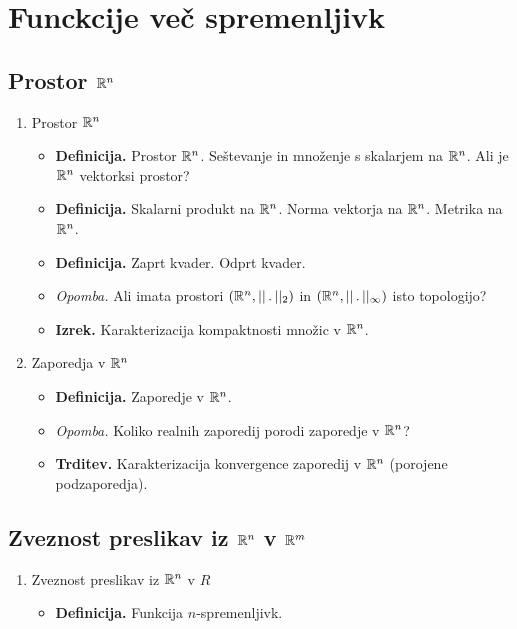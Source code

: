 \section{Funckcije več spremenljivk}
\subsection{Prostor $\mathbb{R}^n$}
\begin{enumerate}
    \item Prostor $\mathbb{R}^n$
    \begin{itemize}
        \item \colorbox{purple!30}{\textbf{Definicija.}} Prostor $\mathbb{R}^n$. Seštevanje in množenje s skalarjem na $\mathbb{R}^n$. Ali je $\mathbb{R}^n$ vektorksi prostor?
        \item \colorbox{purple!30}{\textbf{Definicija.}} Skalarni produkt na $\mathbb{R}^n$. Norma vektorja na $\mathbb{R}^n$. Metrika na $\mathbb{R}^n$.
        \item \colorbox{purple!30}{\textbf{Definicija.}} Zaprt kvader. Odprt kvader.
        \item \colorbox{yellow!30}{\emph{Opomba.}} Ali imata prostori $(\mathbb{R}^n, ||\,. \,||_2)$ in $(\mathbb{R}^n, ||\,. \,||_\infty)$ isto topologijo?
        \item \colorbox{blue!30}{\textbf{Izrek.}} Karakterizacija kompaktnosti množic v $\mathbb{R}^n$.
    \end{itemize}

    \item Zaporedja v $\mathbb{R}^n$
    \begin{itemize}
        \item \colorbox{purple!30}{\textbf{Definicija.}} Zaporedje v $\mathbb{R}^n$.
        \item \colorbox{yellow!30}{\emph{Opomba.}} Koliko realnih zaporedij porodi zaporedje v $\mathbb{R}^n$?
        \item \colorbox{blue!30}{\textbf{Trditev.}} Karakterizacija konvergence zaporedij v $\mathbb{R}^n$ (porojene podzaporedja).
    \end{itemize}
\end{enumerate}

\subsection{Zveznost preslikav iz $\mathbb{R}^n$ v $\mathbb{R}^m$}
\begin{enumerate}
    \item Zveznost preslikav iz $\mathbb{R}^n$ v $R$
    \begin{itemize}
        \item \colorbox{purple!30}{\textbf{Definicija.}} Funkcija $n$-spremenljivk.
    \end{itemize}
\end{enumerate}